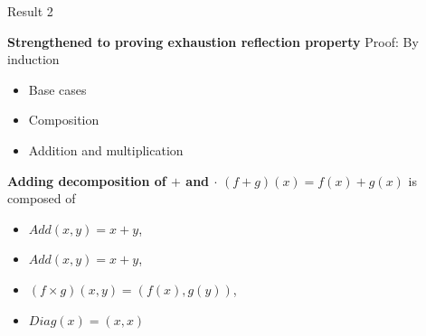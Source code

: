 \begin{frame}{Result 2 }
\begin{minipage}[t]{0.44\linewidth}
\begin{exampleblock}{\textbf{\textcolor{BrickRed}{Strengthened to proving \textbf{exhaustion reflection property}}}}
            \pause
            Proof: By induction 
            \vspace{-0.5em}
            \begin{itemize}
                \setlength\itemsep{-5pt}
                \pause\item Base cases \Checkmark
                \pause\item Composition \Checkmark 
                \pause \item Addition and multiplication \textcolor{Mahogany}{\XSolidBrush}
            \end{itemize}
        \end{exampleblock}
        \vspace{-1em} \pause
        \begin{exampleblock}{\textbf{\textcolor{OliveGreen}{Adding decomposition of $+$ and $\cdot$}}}
        \vspace{-0.5em}
        $(f+g)(x) = f(x)+g(x)$ is composed of
        \vspace{-0.5em}
        \begin{itemize}
            \setlength\itemsep{-4pt}
            \item $\mathit{Add}(x,y) = x + y$,
            \item $\mathit{Add}(x,y) = x + y$,
            \item $(f\times g)(x,y) = (f(x),g(y))$, 
            \item $\mathit{Diag}(x) = (x,x) \qquad$ 
        \end{itemize}
        \end{exampleblock}
    \end{minipage}
    \note[itemize]{
}
\end{frame}

